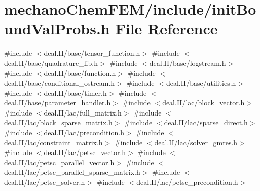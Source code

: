 \section{mechano\+Chem\+F\+E\+M/include/init\+Bound\+Val\+Probs.h File Reference}
\label{init_bound_val_probs_8h}
{\ttfamily \#include $<$deal.\+I\+I/base/tensor\+\_\+function.\+h$>$}\newline
{\ttfamily \#include $<$deal.\+I\+I/base/quadrature\+\_\+lib.\+h$>$}\newline
{\ttfamily \#include $<$deal.\+I\+I/base/logstream.\+h$>$}\newline
{\ttfamily \#include $<$deal.\+I\+I/base/function.\+h$>$}\newline
{\ttfamily \#include $<$deal.\+I\+I/base/conditional\+\_\+ostream.\+h$>$}\newline
{\ttfamily \#include $<$deal.\+I\+I/base/utilities.\+h$>$}\newline
{\ttfamily \#include $<$deal.\+I\+I/base/timer.\+h$>$}\newline
{\ttfamily \#include $<$deal.\+I\+I/base/parameter\+\_\+handler.\+h$>$}\newline
{\ttfamily \#include $<$deal.\+I\+I/lac/block\+\_\+vector.\+h$>$}\newline
{\ttfamily \#include $<$deal.\+I\+I/lac/full\+\_\+matrix.\+h$>$}\newline
{\ttfamily \#include $<$deal.\+I\+I/lac/block\+\_\+sparse\+\_\+matrix.\+h$>$}\newline
{\ttfamily \#include $<$deal.\+I\+I/lac/sparse\+\_\+direct.\+h$>$}\newline
{\ttfamily \#include $<$deal.\+I\+I/lac/precondition.\+h$>$}\newline
{\ttfamily \#include $<$deal.\+I\+I/lac/constraint\+\_\+matrix.\+h$>$}\newline
{\ttfamily \#include $<$deal.\+I\+I/lac/solver\+\_\+gmres.\+h$>$}\newline
{\ttfamily \#include $<$deal.\+I\+I/lac/petsc\+\_\+vector.\+h$>$}\newline
{\ttfamily \#include $<$deal.\+I\+I/lac/petsc\+\_\+parallel\+\_\+vector.\+h$>$}\newline
{\ttfamily \#include $<$deal.\+I\+I/lac/petsc\+\_\+parallel\+\_\+sparse\+\_\+matrix.\+h$>$}\newline
{\ttfamily \#include $<$deal.\+I\+I/lac/petsc\+\_\+solver.\+h$>$}\newline
{\ttfamily \#include $<$deal.\+I\+I/lac/petsc\+\_\+precondition.\+h$>$}\newline
